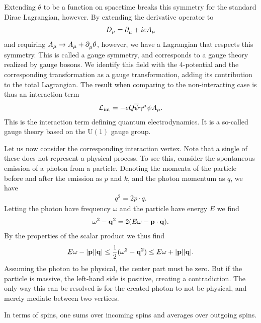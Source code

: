 Extending $\theta$ to be a function on spacetime breaks this symmetry for the standard Dirac Lagrangian, however. By extending the derivative operator to
\begin{align*}
	D_{\mu} = \partial^{}_{\mu} + ieA_{\mu}
\end{align*}
and requiring $A_{\mu}\to A_{\mu} + \partial^{}_{\mu}\theta$, however, we have a Lagrangian that respects this symmetry. This is called a gauge symmetry, and corresponds to a gauge theory realized by gauge bosons. We identify this field with the 4-potential and the corresponding transformation as a gauge transformation, adding its contribution to the total Lagrangian. The result when comparing to the non-interacting case is thus an interaction term
\begin{align*}
	\mathcal{L}_{\text{int}} = -eQ\overline{\psi}\gamma^{\mu}\psi A_{\mu}.
\end{align*}
This is the interaction term defining quantum electrodynamics. It is a so-called gauge theory based on the $\text{U}(1)$ gauge group.

Let us now consider the corresponding interaction vertex. Note that a single of these does not represent a physical process. To see this, consider the spontaneous emission of a photon from a particle. Denoting the momenta of the particle before and after the emission as $p$ and $k$, and the photon momentum as $q$, we have
\begin{align*}
	q^{2} = 2p\cdot q.
\end{align*}
Letting the photon have frequency $\omega$ and the particle have energy $E$ we find
\begin{align*}
	\omega^{2} - \vb{q}^{2} = 2(E\omega - \vb{p}\cdot\vb{q}).
\end{align*}
By the properties of the scalar product we thus find
\begin{align*}
	E\omega - \abs{\vb{p}}\abs{\vb{q}} \leq \frac{1}{2}(\omega^{2} - \vb{q}^{2}) \leq E\omega + \abs{\vb{p}}\abs{\vb{q}}.
\end{align*}
Assuming the photon to be physical, the center part must be zero. But if the particle is massive, the left-hand side is positive, creating a contradiction. The only way this can be resolved is for the created photon to not be physical, and merely mediate between two vertices.

In terms of spins, one sums over incoming spins and averages over outgoing spins.

